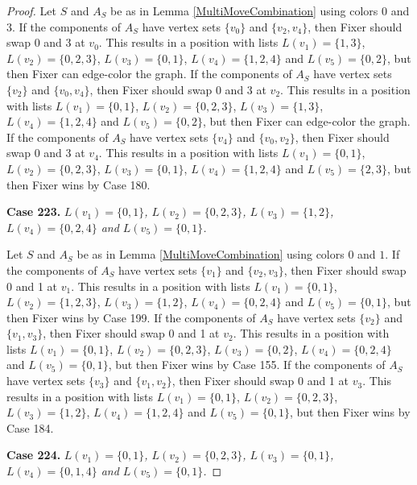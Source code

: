 \documentclass[12pt]{amsart}
\theoremstyle{plain}
\theoremstyle{definition}
\theoremstyle{remark}
\begin{document}
\begin{proof}
Let $S$ and $A_S$ be as in Lemma \ref{MultiMoveCombination} using colors $0$ and $3$. If the components of $A_S$ have vertex sets $\{v_0\}$ and $\{v_2, v_4\}$, then Fixer should swap 0 and 3 at $v_0$. This results in a position with lists $L(v_1) = \{1, 3\}$, $L(v_2) = \{0, 2, 3\}$, $L(v_3) = \{0, 1\}$, $L(v_4) = \{1, 2, 4\}$ and $L(v_5) = \{0, 2\}$, but then Fixer can edge-color the graph.
If the components of $A_S$ have vertex sets $\{v_2\}$ and $\{v_0, v_4\}$, then Fixer should swap 0 and 3 at $v_2$. This results in a position with lists $L(v_1) = \{0, 1\}$, $L(v_2) = \{0, 2, 3\}$, $L(v_3) = \{1, 3\}$, $L(v_4) = \{1, 2, 4\}$ and $L(v_5) = \{0, 2\}$, but then Fixer can edge-color the graph.
If the components of $A_S$ have vertex sets $\{v_4\}$ and $\{v_0, v_2\}$, then Fixer should swap 0 and 3 at $v_4$. This results in a position with lists $L(v_1) = \{0, 1\}$, $L(v_2) = \{0, 2, 3\}$, $L(v_3) = \{0, 1\}$, $L(v_4) = \{1, 2, 4\}$ and $L(v_5) = \{2, 3\}$, but then Fixer wins by Case 180.

\noindent\textbf{Case 223.  }\textit{$L(v_1) = \{0, 1\}$, $L(v_2) = \{0, 2, 3\}$, $L(v_3) = \{1, 2\}$, $L(v_4) = \{0, 2, 4\}$ and $L(v_5) = \{0, 1\}$.}

Let $S$ and $A_S$ be as in Lemma \ref{MultiMoveCombination} using colors $0$ and $1$. If the components of $A_S$ have vertex sets $\{v_1\}$ and $\{v_2, v_3\}$, then Fixer should swap 0 and 1 at $v_1$. This results in a position with lists $L(v_1) = \{0, 1\}$, $L(v_2) = \{1, 2, 3\}$, $L(v_3) = \{1, 2\}$, $L(v_4) = \{0, 2, 4\}$ and $L(v_5) = \{0, 1\}$, but then Fixer wins by Case 199.
If the components of $A_S$ have vertex sets $\{v_2\}$ and $\{v_1, v_3\}$, then Fixer should swap 0 and 1 at $v_2$. This results in a position with lists $L(v_1) = \{0, 1\}$, $L(v_2) = \{0, 2, 3\}$, $L(v_3) = \{0, 2\}$, $L(v_4) = \{0, 2, 4\}$ and $L(v_5) = \{0, 1\}$, but then Fixer wins by Case 155.
If the components of $A_S$ have vertex sets $\{v_3\}$ and $\{v_1, v_2\}$, then Fixer should swap 0 and 1 at $v_3$. This results in a position with lists $L(v_1) = \{0, 1\}$, $L(v_2) = \{0, 2, 3\}$, $L(v_3) = \{1, 2\}$, $L(v_4) = \{1, 2, 4\}$ and $L(v_5) = \{0, 1\}$, but then Fixer wins by Case 184.

\noindent\textbf{Case 224.  }\textit{$L(v_1) = \{0, 1\}$, $L(v_2) = \{0, 2, 3\}$, $L(v_3) = \{0, 1\}$, $L(v_4) = \{0, 1, 4\}$ and $L(v_5) = \{0, 1\}$.}


\end{proof}
\end{document}
